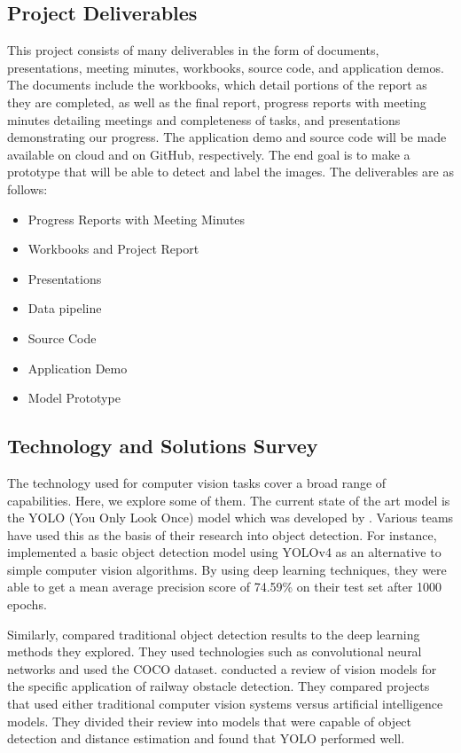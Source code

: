 \documentclass[stu,12pt,floatsintext]{apa7}
\begin{document}
\subsection{Project Deliverables}
This project consists of many deliverables in the form of documents, presentations, meeting minutes, workbooks, source code, and application demos. The documents include the workbooks, which detail portions of the report as they are completed, as well as the final report, progress reports with meeting minutes detailing meetings and completeness of tasks, and presentations demonstrating our progress. The application demo and source code will be made available on cloud and on GitHub, respectively. The end goal is to make a prototype that will be able to detect and label the images.
The deliverables are as follows:

\begin{itemize}
	\item Progress Reports with Meeting Minutes
	\item Workbooks and Project Report
	\item Presentations
	\item Data pipeline
	\item Source Code
	\item Application Demo
	\item Model Prototype
\end{itemize}


\subsection{Technology and Solutions Survey}
The technology used for computer vision tasks cover a broad range of capabilities. Here, we explore some of them. The current state of the art model is the YOLO (You Only Look Once) model which was developed by \textcite{redmon_you_2016}. Various teams have used this as the basis of their research into object detection. For instance, \textcite{sarda_object_2021} implemented a basic object detection model using YOLOv4 as an alternative to simple computer vision algorithms. By using deep learning techniques, they were able to get a mean average precision score of 74.59\% on their test set after 1000 epochs.

Similarly, \textcite{gao_obstacle_2024} compared traditional object detection results to the deep learning methods they explored. They used technologies such as convolutional neural networks and used the COCO dataset. \textcite{ristic-durrant_review_2021} conducted a review of vision models for the specific application of railway obstacle detection. They compared projects that used either traditional computer vision systems versus artificial intelligence models. They divided their review into models that were capable of object detection and distance estimation and found that YOLO performed well.
\end{document}
